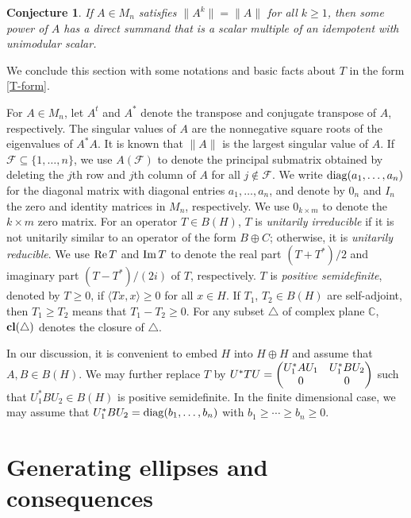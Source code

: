 \documentclass[11pt]{article}
\newtheorem{conjecture}[theorem]{Conjecture}
\numberwithin{equation}{section}
\def\IC{{\mathbb C}}
\def\diag{{\rm diag}}
\def\re{{\rm Re\,}}
\def\im{{\rm Im\,}}
\def\cl{{\bf cl}}
\begin{document}
\begin{conjecture}\label{c11}
If $A \in M_n$ satisfies $\|A^k\| = \|A\|$ for all $k \ge 1$, then some power of $A$ has a direct summand that is a scalar multiple of an idempotent with unimodular scalar.
\end{conjecture}





\medskip

We conclude this section with some notations and basic facts about $T$ in the form
\eqref{T-form}.

For $A \in M_n$, let $A^t$ and $A^*$ denote the transpose and conjugate transpose of $A$, respectively.
The singular values of $A$ are the nonnegative square roots of the eigenvalues of $A^*A$. It is known
that $\|A\|$ is the largest singular value of $A$. If $\mathcal{F}\subseteq\{1, \dots, n\}$, we use
$A(\mathcal{F})$ to denote the principal submatrix obtained by deleting the $j$th row and $j$th column
of $A$ for all $j\not\in \mathcal{F}$. We write $\diag(a_1,\ldots,a_n)$ for the diagonal matrix with
diagonal entries $a_1,\ldots,a_n$, and denote by $0_n$ and $I_n$ the zero and identity matrices in
$M_n$, respectively.  We use $0_{k\times m}$ to denote the $k\times m$
zero matrix. For an operator $T\in B(H)$, $T$ is {\em unitarily irreducible} if it is not
unitarily similar to an operator of the form $B\oplus C$; otherwise, it is {\em unitarily reducible}.
We use $\re T$ and $\im T$ to denote the real part $(T+T^*)/2$ and imaginary part $(T-T^*)/(2i)$ of $T$,
respectively. $T$ is {\em positive semidefinite}, denoted by $T\ge 0$, if $\langle Tx,x\rangle\ge 0$ for all $x\in H$. If
$T_1$, $T_2\in B(H)$ are self-adjoint, then $T_1\ge T_2$ means that $T_1-T_2\ge 0$. For any subset $\bigtriangleup$ of complex plane $\IC$, $\cl(\bigtriangleup)$ denotes the closure of $\bigtriangleup$.

In our discussion, it is convenient to embed $H$ into $H\oplus H$ and assume that
$A, B \in B(H)$. We may further replace $T$ by $U^*TU = \begin{pmatrix} U_1^*AU_1 & U_1^*BU_2\cr
0 & 0 \cr\end{pmatrix}$ such that $U_1^*BU_2 \in B(H)$ is positive semidefinite.
In the finite dimensional case, we may assume that $U_1^*BU_2 = \diag(b_1, \dots, b_n)$
with $b_1 \ge \cdots \ge b_n \ge 0$.

\section{Generating ellipses and consequences}
\end{document}
